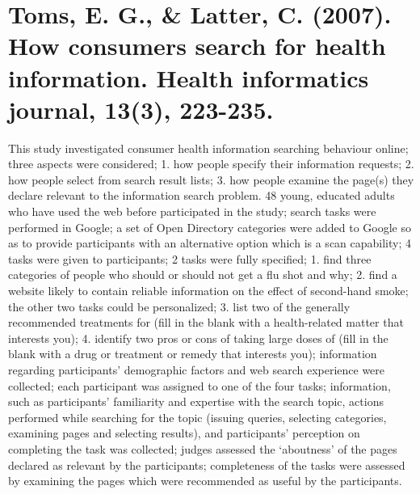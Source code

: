 \documentclass[]{article}
\begin{document}
\section{Toms, E. G., \& Latter, C. (2007). How consumers search for health information. Health informatics journal, 13(3), 223-235.}

This study investigated consumer health information searching behaviour online; three aspects were considered; 1. how people specify their information requests; 2. how people select from search result lists; 3. how people examine the page(s) they declare relevant to the information search problem. 48 young, educated adults who have used the web before participated in the study; search tasks were performed in Google; a set of Open Directory categories were added to Google so as to provide participants with an alternative option which is a scan capability; 4 tasks were given to participants; 2 tasks were fully specified; 1. find three categories of people who should or should not get a flu shot and why; 2. find a website likely to contain reliable information on the effect of second-hand smoke; the other two tasks could be personalized; 3. list two of the generally recommended treatments for (fill in the blank with a health-related matter that interests you); 4. identify two pros or cons of taking large doses of (fill in the blank with a drug or treatment or remedy that interests you); information regarding participants' demographic factors and web search experience were collected; each participant was assigned to one of the four tasks; information, such as participants' familiarity and expertise with the search topic, actions performed while searching for the topic (issuing queries, selecting categories, examining pages and selecting results), and participants' perception on completing the task was collected; judges assessed the ‘aboutness’ of the pages declared as relevant by the participants; completeness of the tasks were assessed by examining the pages which were recommended as useful by the participants.
\end{document}
